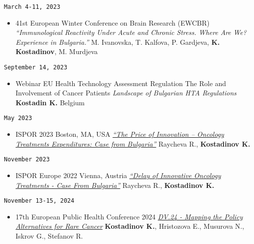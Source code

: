 \documentclass[
  12pt,
  letterpaper,
  DIV=11,
  numbers=noendperiod]{scrartcl}
\providecommand{\tightlist}{%
  \setlength{\itemsep}{0pt}\setlength{\parskip}{0pt}}\usepackage{longtable,booktabs,array}
\begin{document}
\texttt{March\ 4-11,\ 2023}

\begin{itemize}
\tightlist
\item
  41st European Winter Conference on Brain Research (EWCBR) \textbar{}
  \emph{``Immunological Reactivity Under Acute and Chronic Stress. Where
  Are We? Experience in Bulgaria.''} \textbar{} M. Ivanovska, T.
  Kalfova, P. Gardjeva, \textbf{K. Kostadinov}, M. Murdjeva
\end{itemize}

\texttt{September\ 14,\ 2023}

\begin{itemize}
\tightlist
\item
  Webinar \textbar{} EU Health Technology Assessment Regulation
  \textbar{} The Role and Involvement of Cancer Patients \textbar{}
  \emph{Landscape of Bulgarian HTA Regulations} \textbar{}
  \textbf{Kostadin K.} \textbar{} Belgium
\end{itemize}

\texttt{May\ 2023}

\begin{itemize}
\tightlist
\item
  ISPOR 2023 \textbar{} Boston, MA, USA \textbar{}
  \emph{\href{https://www.ispor.org/heor-resources/presentations-database/presentation/intl2023-3665/126756}{``The
  Price of Innovation -- Oncology Treatments Expenditures: Case from
  Bulgaria''}} \textbar{} Raycheva R., \textbf{Kostadinov K.}
\end{itemize}

\texttt{November\ 2023}

\begin{itemize}
\tightlist
\item
  ISPOR Europe 2022 \textbar{} Vienna, Austria \textbar{}
  \emph{\href{https://www.ispor.org/heor-resources/presentations-database/presentation/euro2022-3565/120960}{``Delay
  of Innovative Oncology Treatments - Case From Bulgaria''}} \textbar{}
  Raycheva R., \textbf{Kostadinov K.}
\end{itemize}

\texttt{November\ 13-15,\ 2024}

\begin{itemize}
\tightlist
\item
  17th European Public Health Conference 2024 \textbar{}
  \emph{\href{https://ephconference.eu/app/programme/programme.php?d=displays}{DV.24
  - Mapping the Policy Alternatives for Rare Cancer}} \textbar{}
  \textbf{Kostadinov K.}, Hristozova E., Musurova N., Iskrov G.,
  Stefanov R.
\end{itemize}
\end{document}
